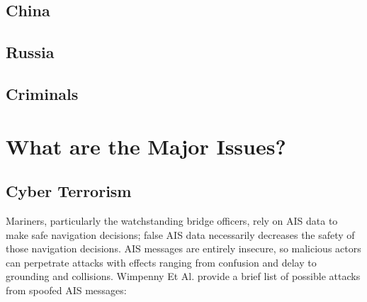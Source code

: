 \documentclass[
]{article}
\begin{document}
\hypertarget{china}{%
\subsection{China}\label{china}}

\hypertarget{russia}{%
\subsection{Russia}\label{russia}}

\hypertarget{criminals}{%
\subsection{Criminals}\label{criminals}}

\hypertarget{what-are-the-major-issues}{%
\section{What are the Major Issues?}\label{what-are-the-major-issues}}

\hypertarget{cyber-terrorism}{%
\subsection{Cyber Terrorism}\label{cyber-terrorism}}

Mariners, particularly the watchstanding bridge officers, rely on AIS
data to make safe navigation decisions; false AIS data necessarily
decreases the safety of those navigation decisions. AIS messages are
entirely insecure, so malicious actors can perpetrate attacks with
effects ranging from confusion and delay to grounding and collisions.
Wimpenny Et Al. provide a brief list of possible attacks from spoofed
AIS messages:
\end{document}
